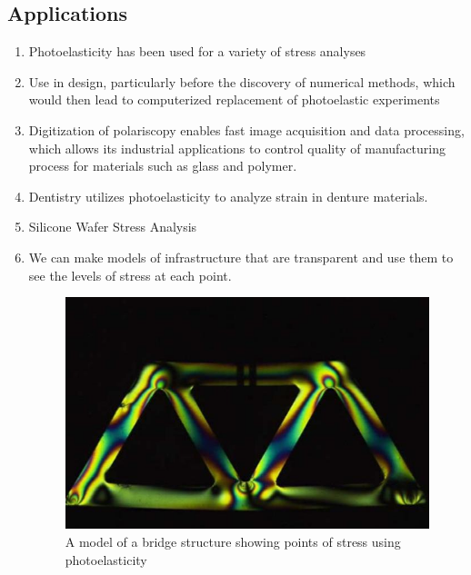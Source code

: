 \documentclass[11pt]{article}
\begin{document}
\subsection{Applications}
\begin{enumerate}
	\item Photoelasticity has been used for a variety of stress analyses
	\item Use in design, particularly before the discovery of numerical methods, which would then lead to computerized replacement of photoelastic experiments
	\item Digitization of polariscopy enables fast image acquisition and data processing, which allows its industrial applications to control quality of manufacturing process for materials such as glass and polymer.
	\item Dentistry utilizes photoelasticity to analyze strain in denture materials.
	\item Silicone Wafer Stress Analysis
	\item We can make models of infrastructure that are transparent and use them to see the levels of stress at each point.
	\begin{figure}[H]
		\centering
		\includegraphics[scale=.5]{bridge.jpg}
		\centering
		\caption{A model of a bridge structure showing points of stress using photoelasticity}
		\label{fig:This figure}
	\end{figure} 
\end{enumerate}
\end{document}
